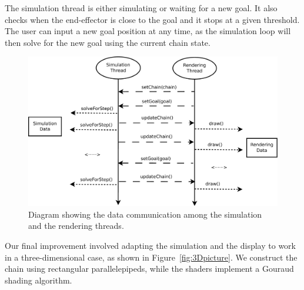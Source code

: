 \documentclass[paper=a4, fontsize=11pt]{scrartcl} %
\numberwithin{equation}{section} %
\numberwithin{figure}{section} %
\numberwithin{table}{section} %
\begin{document}
\vspace{-8mm}
The simulation thread is either simulating or waiting for a new goal. It also checks when the end-effector is close to the goal and it stops at a given threshold. The user can input a new goal position at any time, as the simulation loop will then solve for the new goal using the current chain state.\\

\begin{figure}[h]
\centering
\includegraphics[scale=0.4]{threadDiagram}
\caption{Diagram showing the data communication among the simulation and the rendering threads.}
\label{fig:treadhDiagram}
\end{figure}

Our final improvement involved adapting the simulation and the display to work in a three-dimensional case, as shown in Figure~\ref{fig:3Dpicture}. We construct the chain using rectangular parallelepipeds, while the shaders implement a Gouraud shading algorithm. 

\end{document}
